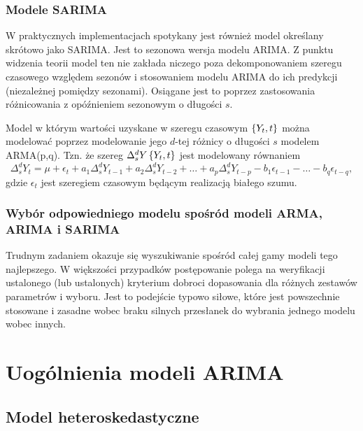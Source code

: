 \documentclass[10pt,a4paper]{book}
\begin{document}
\subsection{Modele SARIMA}

W praktycznych implementacjach spotykany jest również model określany skrótowo jako SARIMA. Jest to sezonowa wersja modelu ARIMA. Z punktu widzenia teorii model ten nie zakłada niczego poza dekomponowaniem szeregu czasowego względem sezonów i stosowaniem modelu ARIMA do ich predykcji (niezależnej pomiędzy sezonami). Osiągane jest to poprzez zastosowania różnicowania z opóźnieniem sezonowym o długości $s$.

\begin{definition}
Model w którym wartości uzyskane w szeregu czasowym $\left\lbrace {{Y_t}, {t}} \right\rbrace$ można modelować poprzez modelowanie jego $d$-tej różnicy o długości $s$ modelem ARMA(p,q). Tzn. że szereg $\Delta^d_s Y\left\lbrace {{Y_t}, {t}} \right\rbrace$ jest modelowany równaniem 
$$
\Delta^d_s Y_t = \mu + \epsilon_t + a_1 \Delta^d_s Y_{t-1} + a_2 \Delta^d_s Y_{t-2} + \ldots + a_p \Delta^d_s Y_{t-p} - b_1 \epsilon_{t-1} -\ldots - b_q \epsilon_{t-q} ,
$$
gdzie $\epsilon_t $ jest szeregiem czasowym będącym realizacją białego szumu.
\end{definition}

\subsection{Wybór odpowiedniego modelu spośród modeli ARMA, ARIMA i SARIMA}

Trudnym zadaniem okazuje się wyszukiwanie spośród całej gamy modeli tego najlepszego. W większości przypadków postępowanie polega na weryfikacji ustalonego (lub ustalonych) kryterium dobroci dopasowania dla różnych zestawów parametrów i wyboru. Jest to podejście typowo siłowe, które jest powszechnie stosowane i zasadne wobec braku silnych przesłanek do wybrania jednego modelu wobec innych.

\chapter{Uogólnienia modeli ARIMA}

\section{Model heteroskedastyczne}
\end{document}
